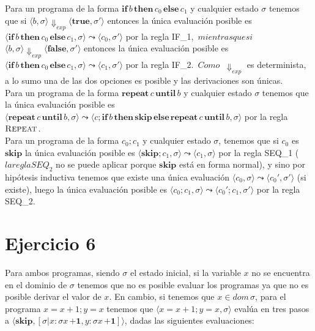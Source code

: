 \documentclass{article}
\begin{document}
\noindent Para un programa de la forma $\textbf{if}\,b\,\textbf{then}\,c_0\,\textbf{else}\,c_1$ y cualquier estado $\sigma$ tenemos que si $\langle b,\sigma\rangle\Downarrow_{exp}\langle\textbf{true},\sigma'\rangle$ entonces la única evaluación posible es \\$\langle\textbf{if}\,b\,\textbf{then}\,c_0\,\textbf{else}\,c_1,\sigma\rangle\leadsto\langle c_0,\sigma'\rangle$ por la regla IF_1, $\,mientras que si\,$ $\langle b,\sigma\rangle\Downarrow_{exp}\langle\textbf{false},\sigma'\rangle$ entonces la única evaluación posible es $\langle\textbf{if}\,b\,\textbf{then}\,c_0\,\textbf{else}\,c_1,\sigma\rangle\leadsto\langle c_1,\sigma'\rangle$ por la regla IF_2. $\,Como\,$ $\Downarrow_{exp}$ es determinista, a lo sumo una de las dos opciones es posible y las derivaciones son únicas.\\

\noindent Para un programa de la forma $\textbf{repeat}\,c\,\textbf{until}\,b$ y cualquier estado $\sigma$ tenemos que la única evaluación posible es \\$\langle\textbf{repeat}\,c\,\textbf{until}\,b,\sigma\rangle\leadsto\langle c;\textbf{if}\,b\,\textbf{then}\,\textbf{skip}\,\textbf{else}\,\textbf{repeat}\,c\,\textbf{until}\,b,\sigma\rangle$ por la regla $\textsc{R\footnotesize{EPEAT}}$.\\

\noindent Para un programa de la forma $c_0;c_1$ y cualquier estado $\sigma$, tenemos que si $c_0$ es $\textbf{skip}$ la única evaluación posible es $\langle\textbf{skip};c_1,\sigma\rangle\leadsto\langle c_1,\sigma\rangle$ por la regla SEQ_1 ($la regla SEQ_2$ no se puede aplicar porque $\textbf{skip}$ está en forma normal), y sino por hipótesis inductiva tenemos que existe una única evaluación $\langle c_0,\sigma\rangle\leadsto\langle c_0',\sigma'\rangle$ (si existe), luego la única evaluación posible es $\langle c_0;c_1,\sigma\rangle\leadsto\langle c_0';c_1,\sigma'\rangle$ por la regla SEQ_2.\\

\section{Ejercicio 6}

Para ambos programas, siendo $\sigma$ el estado inicial, si la variable $x$ no se encuentra en el dominio de $\sigma$ tenemos que no es posible evaluar los programas ya que no es posible derivar el valor de $x$. En cambio, si tenemos que $x\in dom\,\sigma$, para el programa $x=x+1;y=x$ tenemos que $\langle x=x+1;y=x,\sigma\rangle$ evalúa en tres pasos a $\langle\textbf{skip},[\sigma|x:\sigma x\,\textbf{+1},y:\sigma x\,\textbf{+1}]\rangle$, dadas las siguientes evaluaciones:\\
\end{document}
